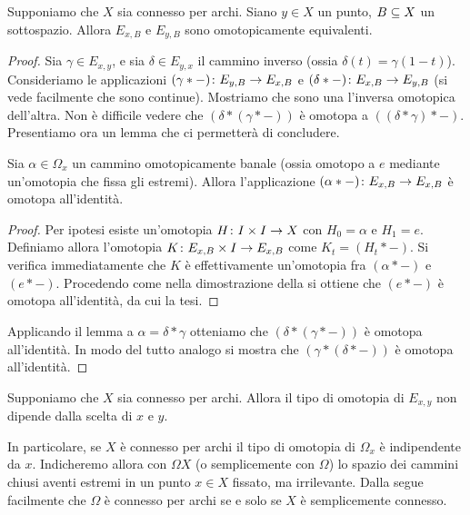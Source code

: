 \begin{proposition}
Supponiamo che \(X\) sia connesso per archi. Siano \(y\in X\) un punto, \(B\subseteq X\) un sottospazio. Allora \(E_{x,B}\) e \(E_{y,B}\) sono omotopicamente equivalenti.
\end{proposition}
\begin{proof}
Sia \(\gamma\in E_{x,y}\), e sia \(\delta\in E_{y,x}\) il cammino inverso (ossia \(\delta(t)=\gamma(1-t)\)). Consideriamo le applicazioni \(\map{(\gamma\ast-)}{E_{y,B}}{E_{x,B}}\) e \(\map{(\delta\ast-)}{E_{x,B}}{E_{y,B}}\) (si vede facilmente che sono continue). Mostriamo che sono una l'inversa omotopica dell'altra. Non è difficile vedere che \((\delta\ast(\gamma\ast-))\) è omotopa a \(((\delta\ast\gamma)\ast-)\). Presentiamo ora un lemma che ci permetterà di concludere.
\begin{lemma}
Sia \(\alpha\in\Omega_x\) un cammino omotopicamente banale (ossia omotopo a \(e\) mediante un'omotopia che fissa gli estremi). Allora l'applicazione \(\map{(\alpha\ast-)}{E_{x,B}}{E_{x,B}}\) è omotopa all'identità.
\end{lemma}
\begin{proof}
Per ipotesi esiste un'omotopia \(\map{H}{I\times I}{X}\) con \(H_0=\alpha\) e \(H_1=e\). Definiamo allora l'omotopia \(\map{K}{E_{x,B}\times I}{E_{x,B}}\) come \(K_t=(H_t\ast-)\). Si verifica immediatamente che \(K\) è effettivamente un'omotopia fra \((\alpha\ast-)\) e \((e\ast-)\). Procedendo come nella dimostrazione della  si ottiene che \((e\ast-)\) è omotopa all'identità, da cui la tesi.
\end{proof}
Applicando il lemma a \(\alpha=\delta\ast\gamma\) otteniamo che \((\delta\ast(\gamma\ast-))\) è omotopa all'identità. In modo del tutto analogo si mostra che \((\gamma\ast(\delta\ast-))\) è omotopa all'identità.
\end{proof}
\begin{corollary}
Supponiamo che \(X\) sia connesso per archi. Allora il tipo di omotopia di \(E_{x,y}\) non dipende dalla scelta di \(x\) e \(y\).
\end{corollary}
In particolare, se \(X\) è connesso per archi il tipo di omotopia di \(\Omega_x\) è indipendente da \(x\). Indicheremo allora con \(\Omega X\) (o semplicemente con \(\Omega\)) lo spazio dei cammini chiusi aventi estremi in un punto \(x\in X\) fissato, ma irrilevante. Dalla  segue facilmente che \(\Omega\) è connesso per archi se e solo se \(X\) è semplicemente connesso.

